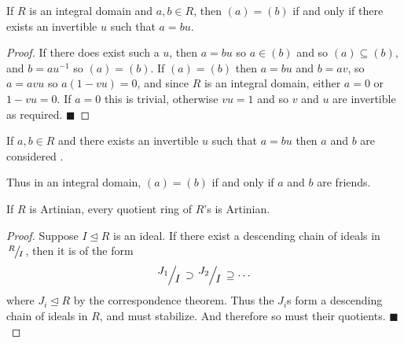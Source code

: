 \documentclass[10pt]{article}
\let\ideal=\trianglelefteq
\def\qed{\hskip1cm\hbox{}\hfill$\blacksquare$}
\begin{document}


\bigskip

\begin{prop*}

    If $R$ is an integral domain and $a,b\in R$, then $(a)=(b)$ if and only if there exists an invertible $u$ such that $a=bu$.

\end{prop*}

\begin{proof}

    If there does exist such a $u$, then $a=bu$ so $a\in(b)$ and so $(a)\subseteq(b)$, and $b=au^{-1}$ so $(a)=(b)$.
    If $(a)=(b)$ then $a=bu$ and $b=av$, so $a=avu$ so $a(1-vu)=0$, and since $R$ is an integral domain, either $a=0$ or $1-vu=0$.
    If $a=0$ this is trivial, otherwise $vu=1$ and so $v$ and $u$ are invertible as required.
    \qed

\end{proof}

\begin{defn*}

    If $a,b\in R$ and there exists an invertible $u$ such that $a=bu$ then $a$ and $b$ are considered .

\end{defn*}

Thus in an integral domain, $(a)=(b)$ if and only if $a$ and $b$ are friends.

\begin{prop*}

    If $R$ is Artinian, every quotient ring of $R$'s is Artinian.

\end{prop*}

\begin{proof}

    Suppose $I\ideal R$ is an ideal.
    If there exist a descending chain of ideals in $\slfrac RI$, then it is of the form
    \[ \slfrac{J_1}I\supset\slfrac{J_2}I\supseteq\cdots \]
    where $J_i\ideal R$ by the correspondence theorem.
    Thus the $J_i$s form a descending chain of ideals in $R$, and must stabilize.
    And therefore so must their quotients.
    \qed

\end{proof}
\end{document}

